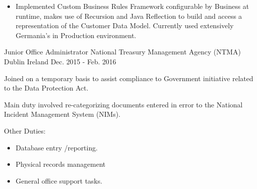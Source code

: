 \begin{cventries}
{\begin{cvitems}
{{\begin{itemize}
            \item {Implemented Custom Business Rules Framework configurable by Business at runtime, makes use of Recursion and Java Reflection to build and access a representation of the Customer Data Model. Currently used extensively Germania's in Production environment. }
            {~\\}
          \end{itemize}}
      }      
    \end{cvitems}
    }
  \cventry
    {Junior Office Administrator} %
    {National Treasury Management Agency (NTMA)} %
    {Dublin Ireland} %
    {Dec. 2015 - Feb. 2016} %
    {
      \begin{cvitems} %
        \item {Joined on a temporary basis to assist compliance to Government initiative related to the Data Protection Act.}
        \item {Main duty involved re-categorizing documents entered in error to the National Incident Management System (NIMs).}
        \item {Other Duties:
        	\begin{itemize}
        		\item {Database entry /reporting.}
			    	\item {Physical records management}
				    \item {General office support tasks.}
		    	\end{itemize}
			}
      \end{cvitems}
    }
\end{cventries}
